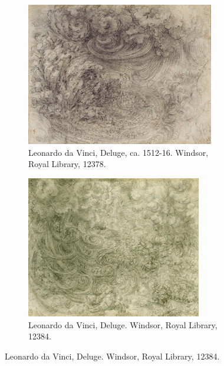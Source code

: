 \documentclass[12pt]{article}
\begin{document}
\begin{figure}[!htb]
	\begin{subfigure}{0.49\textwidth}
		\centering
		\includegraphics[width=0.9\textwidth]{LdV_3}
		\caption{Leonardo da Vinci, Deluge, ca. 1512-16.  Windsor, Royal Library, 12378.}
		\label{fig:3}
	\end{subfigure}
	\begin{subfigure}{0.49\textwidth}
		\centering
		\includegraphics[width=0.84\textwidth]{LdV_4}
		\caption{Leonardo da Vinci, Deluge. Windsor, Royal Library, 12384.}
		\label{fig:4}
	\end{subfigure}
\end{figure}
 
\end{document}
